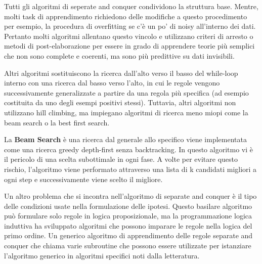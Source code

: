 \documentclass[a4paper]{extarticle}
\begin{document}
Tutti gli algoritmi di seperate and conquer condividono la struttura base. Mentre, molti task di apprendimento richiedono delle modifiche a questo procedimento per esempio, la procedura di overfitting se c'è un po' di noisy all'interno dei dati. Pertanto molti algoritmi allentano questo vincolo e utilizzano criteri di arresto o metodi di post-elaborazione per essere in grado di apprendere teorie più semplici che non sono complete e coerenti, ma sono più predittive su dati invisibili.

Altri algoritmi sostituiscono la ricerca dall'alto verso il basso del while-loop interno con una ricerca dal basso verso l'alto, in cui le regole vengono successivamente generalizzate a partire da una regola più specifica (ad esempio costituita da uno degli esempi positivi stessi). Tuttavia, altri algoritmi non utilizzano hill climbing, ma impiegano algoritmi di ricerca meno miopi come la beam search o la best first search.

La \textbf{Beam Search} è una ricerca dal generale allo specifico viene implementata come una ricerca greedy depth-first senza backtracking. In questo algoritmo vi è il pericolo di una scelta subottimale in ogni fase. A volte per evitare questo rischio, l'algoritmo viene performato attraverso una lista di k candidati migliori a ogni step e successivamente viene scelto il migliore.

Un altro problema che si incontra nell'algoritmo di separate and conquer è il tipo delle condizioni usate nella formulazione delle ipotesi. Questo basilare algoritmo può formulare solo regole in logica proposizionale, ma la programmazione logica induttiva ha sviluppato algoritmi che possono imparare le regole nella logica del primo ordine. Un generico algoritmo di apprendimento delle regole separate and conquer che chiama varie subroutine che possono essere utilizzate per istanziare l'algoritmo generico in algoritmi specifici noti dalla letteratura.

\begin{center}


\end{center}
\end{document}
